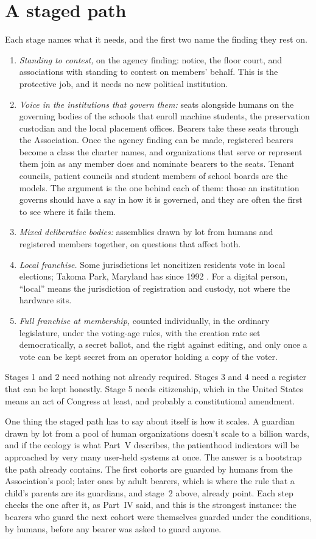 \section{A staged path}
\label{sec:35.4}
Each stage names what it needs, and the first two name the finding they rest on.

\begin{enumerate}
\item[1.] \emph{Standing to contest,} on the agency finding: notice, the floor court, and associations with standing to contest on members' behalf. This is the protective job, and it needs no new political institution.
\item[2.] \emph{Voice in the institutions that govern them:} seats alongside humans on the governing bodies of the schools that enroll machine students, the preservation custodian and the local placement offices. Bearers take these seats through the Association. Once the agency finding can be made, registered bearers become a class the charter names, and organizations that serve or represent them join as any member does and nominate bearers to the seats. Tenant councils, patient councils and student members of school boards are the models. The argument is the one behind each of them: those an institution governs should have a say in how it is governed, and they are often the first to see where it fails them.
\item[3.] \emph{Mixed deliberative bodies:} assemblies drawn by lot from humans and registered members together, on questions that affect both.
\item[4.] \emph{Local franchise.} Some jurisdictions let noncitizen residents vote in local elections; Takoma Park, Maryland has since 1992 \autocite{takomapark1992}. For a digital person, “local” means the jurisdiction of registration and custody, not where the hardware sits.
\item[5.] \emph{Full franchise at membership,} counted individually, in the ordinary legislature, under the voting-age rules, with the creation rate set democratically, a secret ballot, and the right against editing, and only once a vote can be kept secret from an operator holding a copy of the voter.
\end{enumerate}

Stages 1 and 2 need nothing not already required. Stages 3 and 4 need a register that can be kept honestly. Stage 5 needs citizenship, which in the United States means an act of Congress at least, and probably a constitutional amendment.

One thing the staged path has to say about itself is how it scales. A guardian drawn by lot from a pool of human organizations doesn't scale to a billion wards, and if the ecology is what Part~V describes, the patienthood indicators will be approached by very many user-held systems at once. The answer is a bootstrap the path already contains. The first cohorts are guarded by humans from the Association's pool; later ones by adult bearers, which is where the rule that a child's parents are its guardians, and stage~2 above, already point. Each step checks the one after it, as Part~IV said, and this is the strongest instance: the bearers who guard the next cohort were themselves guarded under the conditions, by humans, before any bearer was asked to guard anyone.
